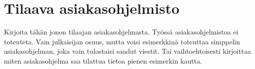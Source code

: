 \chapter{Tilaava asiakasohjelmisto}
\label{ch:tilaava asiakasohjelmisto}
Kirjoita tähän jonon tilaajan asiakasohjelmasta. Työssä asiakasohjelmistoa ei toteuteta. Vain julkaisijan osuus, mutta voisi esimerkkinä toteuttaa simppelin asiakasohjelman, joka vain tulostaisi saadut viestit. Tai vaihtoehtoisesti kirjoittaa miten asiakasohjelma saa tilattua tietoa pienen esimerkin kautta.